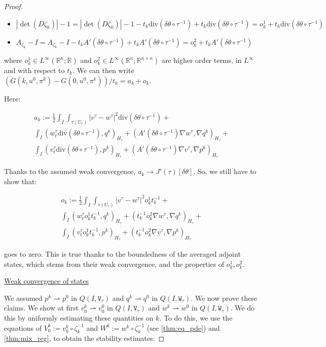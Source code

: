 \documentclass[english,a4paper,10pt,oneside]{scrbook}	%
\theoremstyle{break}
\newenvironment{mproof}[1][\proofname]{%
  \begin{proof}[#1]$ $\par\nobreak\ignorespaces
}{%
  \end{proof}
}
\renewcommand*{\proofname}{Proof}
\theoremstyle{remark}
\newcommand{\mR}{\mathbb{R}}
\newcommand{\te}{\theta}
\newcommand{\dive}{\text{div}}
\newcommand{\weakc}{\rightharpoonup}
\newcommand{\tw}[1]{\texttt{#1}}
\begin{document}
\begin{mproof}
\begin{itemize}
	\item $|\det(D\zeta_k)|-1 = |\det(D\zeta_k)|-1 - t_k\dive(\delta \te \circ \tau^{-1})+t_k\dive(\delta \te \circ \tau^{-1}) = o^1_k + t_k\dive(\delta \te \circ \tau^{-1})$
	\item $A_{\zeta_k}-I = A_{\zeta_k}-I - t_k A'(\delta \te \circ \tau^{-1}) + t_k A'(\delta \te \circ \tau^{-1}) = o_k^2 + t_k A'(\delta \te \circ \tau^{-1}) $
\end{itemize}

where $o^1_k \in L^\infty(\mR^n;\mR)$ and $o^2_k \in L^\infty(\mR^n;\mR^{n\times n})$ are higher order terms, in $L^\infty$ and with respect to $t_k$. We can then write $(G(k,u^0,\pi^k)-G(0,u^0,\pi^k))/t_k = a_k + o_k$.

Here:

\begin{align*}
a_k :=
\frac{1}{2}\int_I \int_{\tau(U_r)}|v^\tau-w^\tau|^2\dive(\delta \te \circ \tau^{-1})+\\
\int_I ( w_t^\tau \dive(\delta \te \circ \tau^{-1}), q^k)_{H_\tau}+ (A'(\delta \te \circ \tau^{-1}) \nabla w^\tau, \nabla q^k)_{H_\tau}+\\
\int_I (v_t^\tau \dive(\delta \te \circ \tau^{-1}),p^k )_{H_\tau} + (A'(\delta \te \circ \tau^{-1})  \nabla v^\tau, \nabla p^k)_{H_\tau} 
\end{align*}

Thanks to the assumed weak convergence, $a_k\rightarrow J'(\tau)[\delta \te]$. So, we still have to show that:

\begin{align*}
o_k:=
\frac{1}{2}\int_I \int_{\tau(U_r)}|v^\tau-w^\tau|^2 o^1_k t_k^{-1}+\\
\int_I ( w_t^\tau o^1_kt_k^{-1}, q^k)_{H_\tau}+ (t_k^{-1}o^2_k\nabla w^\tau, \nabla q^k)_{H_\tau}+\\
\int_I (v_t^\tau o^1_k t_k^{-1},p^k )_{H_\tau} + (t_k^{-1}o^2_k \nabla v^\tau, \nabla p^k)_{H_\tau} 
\end{align*}

goes to zero. This is true thanks to the boundedness of the averaged adjoint states, which stems from their weak convergence, and the properties of $o_k^1,o_k^2$.


\underline{Weak convergence of states}

We assumed $p^k \weakc p^0$ in $Q(I,\tw{V}_\tau)$ and $q^k \weakc q^0$ in $Q(I,\tw{W}_\tau)$. We now prove these claims. We show at first  $v_0^k \weakc v^0_0$ in $Q(I,\tw{V}_\tau)$ and $w^k \weakc w^0$ in $Q(I,\tw{W}_\tau)$. We do this by uniformly estimating these quantities on $k$. To do this, we use the equations of $V_0^k:=v_0^k\circ \zeta_k^{-1}$ and $W^k:=w^k\circ \zeta_k^{-1}$ (see \cref{thm:eq_pde}) and \cref{thm:mix_reg}, to obtain the stability estimates:


\end{mproof}
\end{document}
